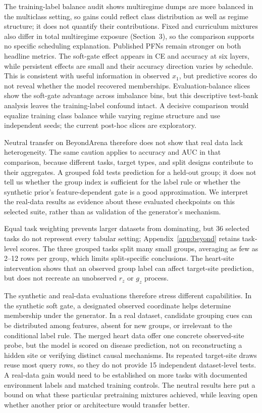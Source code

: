\documentclass{article}
\begin{document}
The training-label balance audit shows multiregime dumps are more balanced in the multiclass setting, so gains could reflect class distribution as well as regime structure; it does not quantify their contributions. Fixed and curriculum mixtures also differ in total multiregime exposure (Section~3), so the comparison supports no specific scheduling explanation. Published PFNs remain stronger on both headline metrics. The soft-gate effect appears in CE and accuracy at six layers, while persistent effects are small and their accuracy direction varies by schedule. This is consistent with useful information in observed $x_1$, but predictive scores do not reveal whether the model recovered memberships. Evaluation-balance slices show the soft-gate advantage across imbalance bins, but this descriptive test-bank analysis leaves the training-label confound intact. A decisive comparison would equalize training class balance while varying regime structure and use independent seeds; the current post-hoc slices are exploratory.

Neutral transfer on BeyondArena therefore does not show that real data lack heterogeneity. The same caution applies to accuracy and AUC in that comparison, because different tasks, target types, and split designs contribute to their aggregates. A grouped fold tests prediction for a held-out group; it does not tell us whether the group index is sufficient for the label rule or whether the synthetic prior's feature-dependent gate is a good approximation. We interpret the real-data results as evidence about these evaluated checkpoints on this selected suite, rather than as validation of the generator's mechanism.

Equal task weighting prevents larger datasets from dominating, but 36 selected tasks do not represent every tabular setting; Appendix~\ref{app:beyond} retains task-level scores. The three grouped tasks split many small groups, averaging as few as 2--12 rows per group, which limits split-specific conclusions. The heart-site intervention shows that an observed group label can affect target-site prediction, but does not recreate an unobserved $r_z$ or $g_z$ process.

The synthetic and real-data evaluations therefore stress different capabilities. In the synthetic soft gate, a designated observed coordinate helps determine membership under the generator. In a real dataset, candidate grouping cues can be distributed among features, absent for new groups, or irrelevant to the conditional label rule. The merged heart data offer one concrete observed-site probe, but the model is scored on disease prediction, not on reconstructing a hidden site or verifying distinct causal mechanisms. Its repeated target-site draws reuse most query rows, so they do not provide 15 independent dataset-level tests. A real-data gain would need to be established on more tasks with documented environment labels and matched training controls. The neutral results here put a bound on what these particular pretraining mixtures achieved, while leaving open whether another prior or architecture would transfer better.
\end{document}
